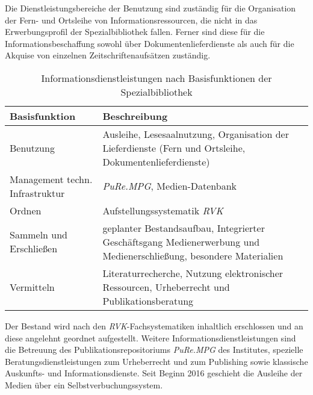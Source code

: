 Die Dienstleistungsbereiche der Benutzung sind zuständig für die Organisation der Fern- und Ortsleihe 
von Informationsressourcen, die nicht in das Erwerbungsprofil der Spezialbibliothek fallen. Ferner sind diese 
für die Informationsbeschaffung sowohl über Dokumentenlieferdienste als auch für die Akquise von einzelnen Zeitschriftenaufsätzen zuständig.

\begingroup
\setlength{\tabcolsep}{12pt} %
\renewcommand{\arraystretch}{1.5} 
\begin{table}[h]
    \centering
    \begin{adjustbox}{max width=\textwidth}
    \begin{tabular}{p{}p{}}
       \toprule
       Basisfunktion                            & Beschreibung\\
       \midrule
        Benutzung                               &Ausleihe, Lesesaalnutzung, Organisation der Lieferdienste (Fern und Ortsleihe, Dokumentenlieferdienste)\\
        Management techn. Infrastruktur         &\textit{\acrshort{PuRe.MPG}}, Medien-Datenbank\\
        Ordnen                                  &Aufstellungssystematik \textit{\acrshort{RVK}}\\
        Sammeln und Erschließen                 &geplanter Bestandsaufbau, Integrierter Geschäftsgang Medienerwerbung und Medienerschließung, besondere Materialien\\
        Vermitteln                              &Literaturrecherche, Nutzung elektronischer Ressourcen, Urheberrecht und Publikationsberatung\\
   
       \bottomrule
    \end{tabular}
    \end{adjustbox}
    \caption{%
        Informationsdienstleistungen nach Basisfunktionen der Spezialbibliothek
    }
    \label{tab:Informationsdienstleistungen}
    \end{table}
\endgroup

Der Bestand wird nach den \textit{\acrshort{RVK}}-Fachsystematiken inhaltlich erschlossen und an diese angelehnt geordnet aufgestellt.
Weitere Informationsdienstleistungen sind die Betreuung des Publikationsrepositoriums \textit{\acrshort{PuRe.MPG}} des Institutes, spezielle Beratungsdienstleistungen 
zum Urheberrecht und zum Publishing sowie klassische Auskunfts- und Informationsdienste. Seit Beginn 2016 
geschieht die Ausleihe der Medien über ein Selbstverbuchungssystem.\\


